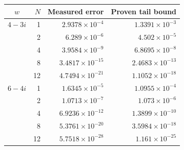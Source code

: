 \begin{tabular}{@{}crrr@{}}
\toprule
$w$ & $N$ & Measured error & Proven tail bound \\
\midrule
$4-3i$ & 1 & $2.9378\mathbin{\times}10^{-4}$ & $1.3391\mathbin{\times}10^{-3}$ \\
 & 2 & $6.289\mathbin{\times}10^{-6}$ & $4.502\mathbin{\times}10^{-5}$ \\
 & 4 & $3.9584\mathbin{\times}10^{-9}$ & $6.8695\mathbin{\times}10^{-8}$ \\
 & 8 & $3.4817\mathbin{\times}10^{-15}$ & $2.4683\mathbin{\times}10^{-13}$ \\
 & 12 & $4.7494\mathbin{\times}10^{-21}$ & $1.1052\mathbin{\times}10^{-18}$ \\
\addlinespace
$6-4i$ & 1 & $1.6345\mathbin{\times}10^{-5}$ & $1.0955\mathbin{\times}10^{-4}$ \\
 & 2 & $1.0713\mathbin{\times}10^{-7}$ & $1.073\mathbin{\times}10^{-6}$ \\
 & 4 & $6.9236\mathbin{\times}10^{-12}$ & $1.3899\mathbin{\times}10^{-10}$ \\
 & 8 & $5.3761\mathbin{\times}10^{-20}$ & $3.5984\mathbin{\times}10^{-18}$ \\
 & 12 & $5.7518\mathbin{\times}10^{-28}$ & $1.161\mathbin{\times}10^{-25}$ \\
\bottomrule
\end{tabular}
